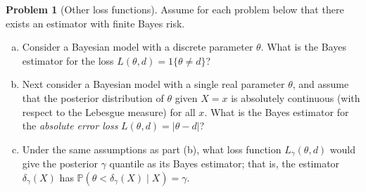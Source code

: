 \documentclass{article}
\newcommand{\PP}{\mathbb{P}}
\theoremstyle{definition}
\newtheorem{problem}{Problem}
\begin{document}
\begin{problem}[Other loss functions]

Assume for each problem below that there exists an estimator with finite Bayes risk.
\begin{enumerate}[(a)]
\item Consider a Bayesian model with a discrete parameter $\theta$. What is the Bayes estimator for the loss $L(\theta, d) = 1\{\theta \neq d\}$?




\item Next consider a Bayesian model with a single real parameter $\theta$, and assume that the posterior distribution of $\theta$ given $X=x$ is absolutely continuous (with respect to the Lebesgue measure) for all $x$. What is the Bayes estimator for the {\em absolute error loss} $L(\theta, d) = |\theta-d|$? 




\item Under the same assumptions as part (b), what loss function $L_\gamma(\theta, d)$ would give the posterior $\gamma$ quantile as its Bayes estimator; that is, the estimator $\delta_\gamma(X)$ has $\PP(\theta < \delta_\gamma(X) \mid X) = \gamma$.





\end{enumerate}
\end{problem}




\end{document}
